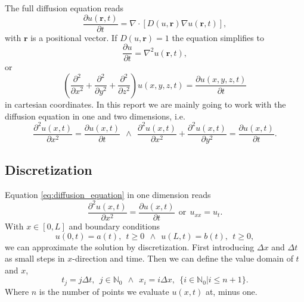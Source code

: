 \documentclass[reprint, english,notitlepage,nofootinbib]{revtex4-1}  %
\begin{document}
The full diffusion equation reads
\begin{equation*}
	\frac{\partial u(\mathbf{r}, t)}{\partial t} = \nabla \cdot \left[D(u, \mathbf{r})\nabla u(\mathbf{r}, t)\right],
\end{equation*}
with $\mathbf{r}$ is a positional vector. If $D(u,\mathbf{r}) = 1$ the equation simplifies to
\begin{equation*}
	\frac{\partial u}{\partial t} = \nabla^2u(\mathbf{r}, t),
\end{equation*}
or
\begin{equation}
	\label{eq:diffusion_equation}
	\left(\frac{\partial^2}{\partial x^2} + \frac{\partial^2}{\partial y^2} + \frac{\partial^2}{\partial z^2}\right) u(x,y,z,t) = \frac{\partial u(x,y,z,t)}{\partial t}
\end{equation}
in cartesian coordinates. In this report we are mainly going to work with the diffusion equation in one and two dimensions, i.e.
\begin{equation*}
	\frac{\partial^2 u(x,t)}{\partial x^2} = \frac{\partial u(x,t)}{\partial t} \ \ \wedge \ \ \frac{\partial^2u(x,t)}{\partial x^2} + \frac{\partial^2u(x,t)}{\partial y^2} = \frac{\partial u(x,t)}{\partial t}.
\end{equation*}

\subsection*{Discretization}

Equation \eqref{eq:diffusion_equation} in one dimension reads
\begin{equation}
\frac{\partial^2u(x, t)}{\partial x^2} = \frac{\partial u(x,t)}{\partial t} \ \ \text{or} \ \ u_{xx} = u_t.
\end{equation}
With $x\in[0,L]$ and boundary conditions
\begin{equation}
\label{eq:boundary_conditions}
u(0, t) = a(t), \ \ t\geq 0 \ \ \wedge \ \ u(L,t) = b(t), \ \ t\geq 0,
\end{equation}
we can approximate the solution by discretization. First introducing $\Delta x$ and $\Delta t$ as small steps in $x$-direction and time. Then we can define the value domain of $t$ and $x$,
\begin{equation*}
t_j = j\Delta t, \ \ j\in \mathbb{N}_0 \ \ \wedge \ \ x_i = i\Delta x, \ \ \{i \in \mathbb{N}_0 | i \leq n + 1\}.
\end{equation*}
Where $n$ is the number of points we evaluate $u(x,t)$ at, minus one. 
\end{document}
